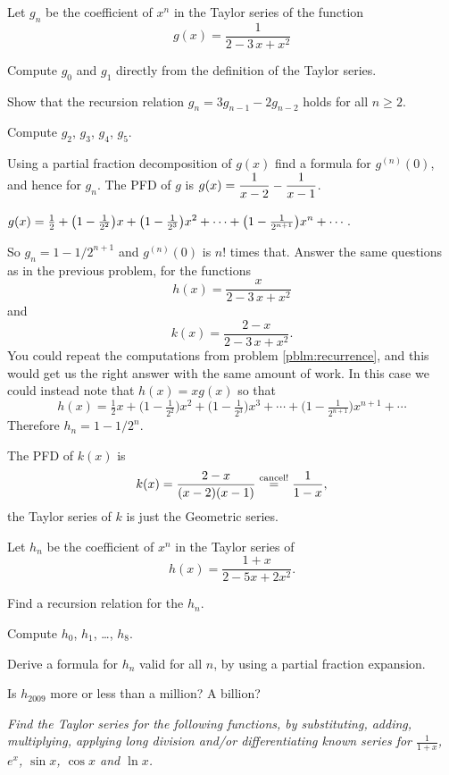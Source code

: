 \begin{multicols}{2}
\problem\label{pblm:recurrence} \groupproblem  Let $g_n$ be the coefficient of $x^n$ in %
the Taylor series of the function
\[
g(x) = \frac1{2-3\,x+x^2}
\]

\subprob Compute $g_0$ and $g_1$ directly from the definition of the Taylor
series.

\subprob Show that the recursion relation $g_n = 3g_{n-1}-2g_{n-2}$ holds for
all $n\geq 2$.

\subprob Compute $g_2$, $g_3$, $g_4$, $g_5$.

\subprob Using a partial fraction decomposition of $g (x)$ find a formula for
$ g^{(n)}(0)$, and hence for $g_n$.
\answer %
The PFD of $g$ is $\displaystyle g(x) = \frac1{x-2} - \frac1{x-1}$.

$\displaystyle g(x) = \tfrac12 + \bigl(1-\tfrac1{2^2}\bigr) x
+\bigl(1-\tfrac1{2^3}\bigr) x^2 + \cdots +
\bigl(1-\tfrac1{2^{n+1}}\bigr) x^n + \cdots$.

So $g_n = 1-1/2^{n+1}$ and $g^{(n)}(0)$ is $n!$ times that.
\endanswer
\problem Answer the same questions as in the previous problem, for the %
functions
\[
h(x) = \frac{x}{2-3\,x+x^2}
\]
and
\[
k(x) = \frac{2-x}{2-3\,x+x^2}.
\]
\answer %
You could repeat the computations from problem \ref{pblm:recurrence},
and this would get us  the right answer with the same amount of work.
In this case we  could instead note that $h(x) = xg(x)$ so that
\[
h(x) = \tfrac12x + \bigl(1-\tfrac1{2^2}\bigr) x^2
+\bigl(1-\tfrac1{2^3}\bigr) x^3 + \cdots +
\bigl(1-\tfrac1{2^{n+1}}\bigr) x^{n+1} + \cdots
\]
Therefore $h_n = 1-1/2^n$.

The PFD of $k(x)$ is
\[
k(x) = \frac{2-x}{(x-2)(x-1)} \stackrel{\rm cancel!}{=} \frac1{1-x},
\]
the Taylor series of $k$ is just the Geometric series.
\endanswer

\problem Let $h_n$ be the coefficient of $x^n$ in the Taylor series of %
\[
h (x) =\frac{1+x}{2-5x+2x^2}.
\]

\subprob Find a recursion relation for the $h_n$.

\subprob Compute $h_0$, $h_1$, \ldots, $h_8$.

\subprob Derive a formula for $h_n$ valid for all $n$, by using a partial
fraction expansion.

\subprob Is $h_{2009}$ more or less than a million? A billion?


{\noindent\color{darkbluegreen}%
\textit{Find the Taylor series for the following functions, by
substituting, adding, multiplying, applying long division and/or
differentiating known series for $\frac1{1+x}$, $e^x$, $\sin x$, $\cos
x$ and $\ln x$.}}


\end{multicols}
